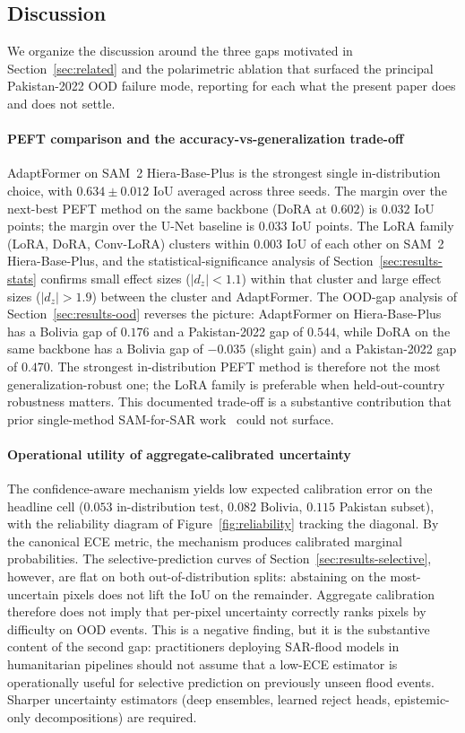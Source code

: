 \documentclass[conference]{IEEEtran}
\begin{document}
\subsection{Discussion}
\label{sec:discussion}

We organize the discussion around the three gaps motivated in Section~\ref{sec:related} and the polarimetric ablation that surfaced the principal Pakistan-2022 OOD failure mode, reporting for each what the present paper does and does not settle.

\paragraph{PEFT comparison and the accuracy-vs-generalization trade-off}
AdaptFormer on SAM~2 Hiera-Base-Plus is the strongest single in-distribution choice, with $0.634 \pm 0.012$ IoU averaged across three seeds. The margin over the next-best PEFT method on the same backbone (DoRA at $0.602$) is $0.032$ IoU points; the margin over the U-Net baseline is $0.033$ IoU points. The LoRA family (LoRA, DoRA, Conv-LoRA) clusters within $0.003$ IoU of each other on SAM~2 Hiera-Base-Plus, and the statistical-significance analysis of Section~\ref{sec:results-stats} confirms small effect sizes ($|d_z| < 1.1$) within that cluster and large effect sizes ($|d_z| > 1.9$) between the cluster and AdaptFormer. The OOD-gap analysis of Section~\ref{sec:results-ood} reverses the picture: AdaptFormer on Hiera-Base-Plus has a Bolivia gap of $0.176$ and a Pakistan-2022 gap of $0.544$, while DoRA on the same backbone has a Bolivia gap of $-0.035$ (slight gain) and a Pakistan-2022 gap of $0.470$. The strongest in-distribution PEFT method is therefore not the most generalization-robust one; the LoRA family is preferable when held-out-country robustness matters. This documented trade-off is a substantive contribution that prior single-method SAM-for-SAR work~\cite{Pu2025CWSAM} could not surface.

\paragraph{Operational utility of aggregate-calibrated uncertainty}
The confidence-aware mechanism yields low expected calibration error on the headline cell ($0.053$ in-distribution test, $0.082$ Bolivia, $0.115$ Pakistan subset), with the reliability diagram of Figure~\ref{fig:reliability} tracking the diagonal. By the canonical ECE metric, the mechanism produces calibrated marginal probabilities. The selective-prediction curves of Section~\ref{sec:results-selective}, however, are flat on both out-of-distribution splits: abstaining on the most-uncertain pixels does not lift the IoU on the remainder. Aggregate calibration therefore does not imply that per-pixel uncertainty correctly ranks pixels by difficulty on OOD events. This is a negative finding, but it is the substantive content of the second gap: practitioners deploying SAR-flood models in humanitarian pipelines should not assume that a low-ECE estimator is operationally useful for selective prediction on previously unseen flood events. Sharper uncertainty estimators (deep ensembles, learned reject heads, epistemic-only decompositions) are required.
\end{document}
